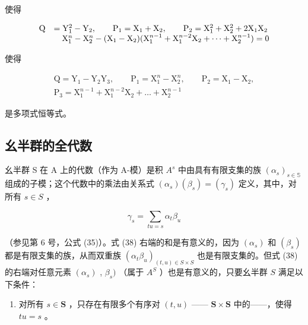 使得

\[
\begin{array}{r l} \mathrm{Q} & = \mathrm{Y} _ {1} ^ {2} - \mathrm{Y} _ {2}, \qquad \mathrm{P} _ {1} = \mathrm{X} _ {1} + \mathrm{X} _ {2}, \qquad \mathrm{P} _ {2} = \mathrm{X} _ {1} ^ {2} + \mathrm{X} _ {2} ^ {2} + 2 \mathrm{X} _ {1} \mathrm{X} _ {2} \\ & \quad \mathrm{X} _ {1} ^ {n} - \mathrm{X} _ {2} ^ {n} - (\mathrm{X} _ {1} - \mathrm{X} _ {2}) (\mathrm{X} _ {1} ^ {n - 1} + \mathrm{X} _ {1} ^ {n - 2} \mathrm{X} _ {2} + \dots + \mathrm{X} _ {2} ^ {n - 1}) = 0 \end{array}
\]

使得

\[
\begin{array}{c} \mathrm{Q} = \mathrm{Y} _ {1} - \mathrm{Y} _ {2} \mathrm{Y} _ {3}, \qquad \mathrm{P} _ {1} = \mathrm{X} _ {1} ^ {n} - \mathrm{X} _ {2} ^ {n}, \qquad \mathrm{P} _ {2} = \mathrm{X} _ {1} - \mathrm{X} _ {2}, \\ \mathrm{P} _ {3} = \mathrm{X} _ {1} ^ {n - 1} + \mathrm{X} _ {1} ^ {n - 2} \mathrm{X} _ {2} + \dots + \mathrm{X} _ {2} ^ {n - 1} \end{array}
\]

是多项式恒等式。

\subsection{幺半群的全代数}

幺半群 S 在 A 上的代数（作为 A-模）是积 \(A^{s}\) 中由具有有限支集的族 \((\alpha_{s})_{s\in\mathbb{S}}\) 组成的子模；这个代数中的乘法由关系式 \((\alpha_{s})(\beta_{s})=(\gamma_{s})\) 定义，其中，对所有 \(s\in S\) ，

\[
\gamma_ {s} = \sum_ {t u = s} \alpha_ {t} \beta_ {u}\tag{38}
\]

（参见第 6 号，公式 (35)）。式 (38) 右端的和是有意义的，因为 \((\alpha_{s})\) 和 \((\beta_{s})\) 都是有限支集的族，从而双重族 \((\alpha_{t}\beta_{u})_{(t,u)\in S\times S}\) 也是有限支集的。但式 (38) 的右端对任意元素 \((\alpha_{s})\) , \(\beta_{s})\) （属于 \(A^{S}\) ）也是有意义的，只要幺半群 \(S\) 满足以下条件：

\begin{enumerate}
\def\labelenumi{(\Alph{enumi})}
\setcounter{enumi}{3}
\tightlist
\item
  对所有 \(s \in \mathbf{S}\) ，只存在有限多个有序对 \((t, u)\) —— \(\mathbf{S} \times \mathbf{S}\) 中的——，使得 \(tu = s\) 。
\end{enumerate}

